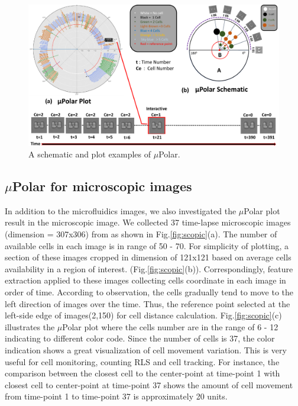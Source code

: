 \documentclass[conference]{IEEEtran}
\begin{document}
\begin{figure}
\centering
\includegraphics[width=\textwidth,height=10 cm]{Patterns/polar.pdf}
\caption{A schematic and plot examples of $\mu$Polar.}
\label{fig:polar}
\end{figure}


\subsection{$\mu$Polar for microscopic images}
In addition to the microfluidics images, we also investigated the $\mu$Polar plot result in the microscopic image. We collected 37 time-lapse microscopic images (dimension = 307x306) from \cite{ref05} as shown in Fig.\ref{fig:scopic}(a). The number of available cells in each image is in range of 50 - 70. For simplicity of plotting, a section of these images cropped in dimension of 121x121 based on average cells availability in a region of interest. (Fig.\ref{fig:scopic}(b)). Correspondingly, feature extraction applied to these images collecting cells coordinate in each image in order of time. According to observation, the cells gradually tend to move to the left direction of images over the time. Thus, the reference point selected at the left-side edge of images(2,150) for cell distance calculation. Fig.\ref{fig:scopic}(c) illustrates the $\mu$Polar plot where the cells number are in the range of 6 - 12 indicating to different color code. Since the number of cells is 37, the color indication shows a great visualization of cell movement variation. This is very useful for cell monitoring, counting RLS and cell tracking. For instance, the comparison between the closest cell to the center-point at time-point 1 with closest cell to center-point at time-point 37 shows the amount of cell movement from time-point 1 to time-point 37 is approximately 20 units.        
\end{document}
